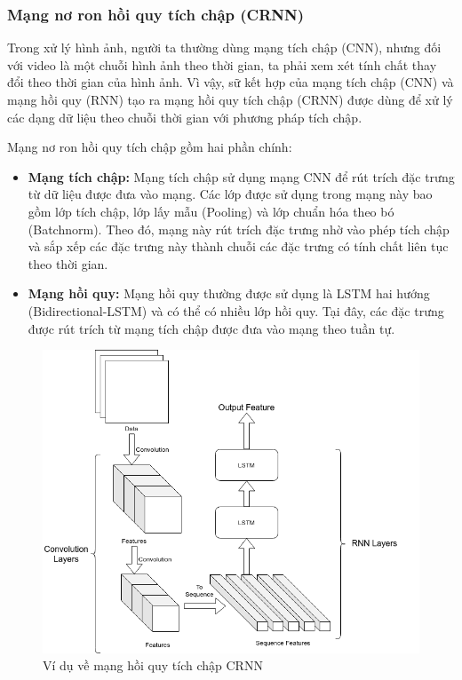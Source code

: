 \subsubsection{Mạng nơ ron hồi quy tích chập (CRNN)}

Trong xử lý hình ảnh, người ta thường dùng mạng tích chập (CNN), nhưng đối với video là một chuỗi hình ảnh theo thời gian, ta phải xem xét tính chất thay đổi theo thời gian của hình ảnh. Vì vậy, sữ kết hợp của mạng tích chập (CNN) và mạng hồi quy (RNN) tạo ra mạng hồi quy tích chập (CRNN) được dùng để xử lý các dạng dữ liệu theo chuỗi thời gian với phương pháp tích chập.

Mạng nơ ron hồi quy tích chập gồm hai phần chính:
\begin{itemize}
    \item \textbf{Mạng tích chập:} Mạng tích chập sử dụng mạng CNN để rút trích đặc trưng từ dữ liệu được đưa vào mạng. Các lớp được sử dụng trong mạng này bao gồm lớp tích chập, lớp lấy mẫu (Pooling) và lớp chuẩn hóa theo bó (Batchnorm). Theo đó, mạng này rút trích đặc trưng nhờ vào phép tích chập và sắp xếp các đặc trưng này thành chuỗi các đặc trưng có tính chất liên tục theo thời gian.
    \item \textbf{Mạng hồi quy:} Mạng hồi quy thường được sử dụng là LSTM hai hướng (Bidirectional-LSTM) và có thể có nhiều lớp hồi quy. Tại đây, các đặc trưng được rút trích từ mạng tích chập được đưa vào mạng theo tuần tự.
\end{itemize}

\begin{figure}[H]
    \centering
    \includegraphics[width=13cm]{./content/materials/crnn.png}
    \caption{Ví dụ về mạng hồi quy tích chập CRNN}
\end{figure}

